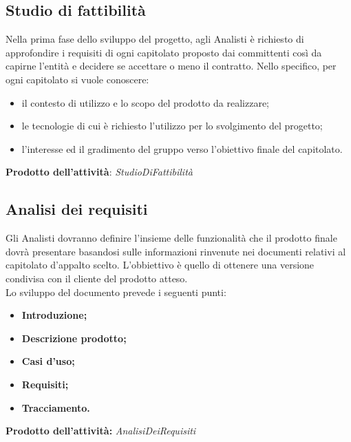 \documentclass[11pt,a4paper]{article}
\begin{document}
	\subsection{Studio di fattibilità}
	Nella prima fase dello sviluppo del progetto, agli Analisti è richiesto di approfondire i requisiti di ogni capitolato proposto dai committenti così da capirne l'entità e decidere se accettare o meno il contratto. Nello specifico, per ogni capitolato si vuole conoscere:
	\begin{itemize}
		\item il contesto di utilizzo e lo scopo del prodotto da realizzare;
		\item le tecnologie di cui è richiesto l'utilizzo per lo svolgimento del progetto;
		\item l'interesse ed il gradimento del gruppo verso l'obiettivo finale del capitolato.
	\end{itemize}
	\textbf{Prodotto dell'attività}: \textit{StudioDiFattibilità}
	
	\subsection{Analisi dei requisiti}
	Gli Analisti dovranno definire l'insieme delle funzionalità che il prodotto finale dovrà presentare basandosi sulle informazioni rinvenute nei documenti relativi al capitolato d'appalto scelto. L'obbiettivo è quello di ottenere una versione condivisa con il cliente del prodotto atteso.\\
	
	Lo sviluppo del documento prevede i seguenti punti:	
	\begin{itemize}
		\item \textbf{Introduzione;}
		\item \textbf{Descrizione prodotto;}
		\item \textbf{Casi d'uso;}
		\item \textbf{Requisiti;}
		\item \textbf{Tracciamento.}
	\end{itemize}

	\textbf{Prodotto dell'attività:} \textit{AnalisiDeiRequisiti}
	
\end{document}
